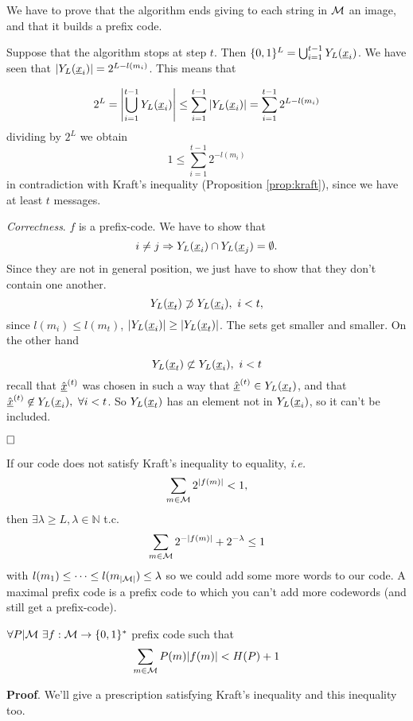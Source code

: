 We have to prove that the algorithm ends giving to each string in $\mathcal{M}$ an image, and that it builds a prefix code.

\noindent Suppose that the algorithm stops at step $t$. Then $\{0, 1\}^L = \bigcup_{i = 1}^{t-1}Y_L(\underline{x}_i)$. We have seen that $|Y_L(\underline{x}_i)| = 2^{L - l(m_i)}$. This means that

\[
2^L = \left|\bigcup_{i=1}^{t-1}Y_L(\underline{x}_i) \right| \leq \sum_{i=1}^{t-1}|Y_L(\underline{x}_i)| = \sum_{i=1}^{t-1} 2^{L-l(m_i)}
\]
dividing by $2^L$ we obtain
$$1 \leq \sum_{i=1}^{t-1}2^{-l(m_i)}$$
in contradiction with Kraft's inequality (Proposition \ref{prop:kraft}), since we have at least $t$ messages. 


\noindent\emph{Correctness}. $f$ is a prefix-code. We have to show that $$i \not= j \Rightarrow Y_L(\underline{x}_i) \cap Y_L(\underline{x}_j) = \emptyset.$$
Since they are not in general position, we just have to show that they don't contain one another. $$Y_L(\underline{x}_t) \not\supset Y_L(\underline{x}_i),\ i < t,$$ since $l(m_i) \leq l(m_t)$, $|Y_L(\underline{x}_i)| \geq |Y_L(\underline{x}_t)|$. The sets get smaller and smaller. On the other hand

$$Y_L(\underline{x}_t) \not\subset Y_L(\underline{x}_i),\ i < t$$
recall that $\hat{\underline{x}}^{(t)}$ was chosen in such a way that $\hat{\underline{x}}^{(t)} \in Y_L(\underline{x}_t)$, and that $\hat{\str{x}}^{(t)} \not\in \prol{\str{x}_i},\ \forall i < t$. So $Y_L(\underline{x}_t)$ has an element not in $Y_L(\underline{x}_i)$, so it can't be included.

$\hfill\Box$

If our code does not satisfy Kraft's inequality to equality, \emph{i.e.} $$\sum_{m\in\mathcal{M}}2^{|f(m)|} < 1,$$ then $\exists \lambda \geq L, \lambda \in \mathbb{N}$ t.c. $$\sum_{m\in\mathcal{M}}2^{-|f(m)|} + 2^{-\lambda} \leq 1$$ with $l(m_1) \leq \cdots \leq l(m_{|\mathcal{M}|}) \leq \lambda$ so we could add some more words to our code. A maximal prefix code is a prefix code to which you can't add more codewords (and still get a prefix-code).

\begin{prop}
 $\forall P|\mathcal{M}\ \exists f:\mathcal{M} \rightarrow \{0, 1\}^*$ prefix code such that
 \[
  \sum_{m\in \mathcal{M}} P(m)|f(m)| < H(P) + 1
 \]
\end{prop}

\noindent\textbf{Proof}. We'll give a prescription satisfying Kraft's inequality and this inequality too. 

